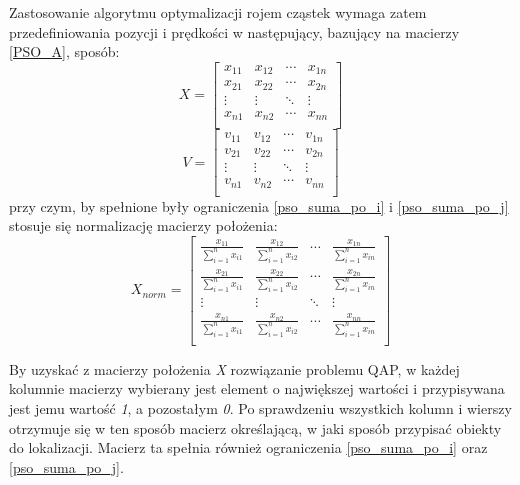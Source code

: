 Zastosowanie algorytmu optymalizacji rojem cząstek wymaga zatem przedefiniowania pozycji i prędkości w następujący, bazujący na macierzy \ref{PSO_A}, sposób:
\newline
\begin{equation}
X=
\begin{bmatrix}
x_{11} & x_{12} & \cdots & x_{1n} \\
x_{21} & x_{22} & \cdots & x_{2n} \\
\vdots & \vdots & \ddots & \vdots \\
x_{n1} & x_{n2} & \cdots & x_{nn} \\
\end{bmatrix}
\end{equation} 
\newline
\begin{equation}
V=
\begin{bmatrix}
v_{11} & v_{12} & \cdots & v_{1n} \\
v_{21} & v_{22} & \cdots & v_{2n} \\
\vdots & \vdots & \ddots & \vdots \\
v_{n1} & v_{n2} & \cdots & v_{nn} \\
\end{bmatrix}
\end{equation}
\newline
przy czym, by spełnione były ograniczenia \ref{pso_suma_po_i} i \ref{pso_suma_po_j} stosuje się normalizację macierzy położenia:
\newline
\begin{equation}
X_{norm}=
\begin{bmatrix}
\frac{x_{11}}{\sum\limits_{i=1}^n x_{i1}} & \frac{x_{12}}{\sum\limits_{i=1}^n x_{i2}} & \cdots &\frac{x_{1n}}{\sum\limits_{i=1}^n x_{in}} \\
\frac{x_{21}}{\sum\limits_{i=1}^n x_{i1}} & \frac{x_{22}}{\sum\limits_{i=1}^n x_{i2}} & \cdots & \frac{x_{2n}}{\sum\limits_{i=1}^n x_{in}} \\
\vdots & \vdots & \ddots & \vdots \\
\frac{x_{n1}}{\sum\limits_{i=1}^n x_{i1}} & \frac{x_{n2}}{\sum\limits_{i=1}^n x_{i2}} & \cdots & \frac{x_{nn}}{\sum\limits_{i=1}^n x_{in}} \\
\end{bmatrix}
\end{equation}
\newline

By uzyskać z macierzy położenia \textit{X} rozwiązanie problemu QAP, w każdej kolumnie macierzy wybierany jest element o największej wartości i przypisywana jest jemu wartość \textit{1}, a pozostałym \textit{0}. Po sprawdzeniu wszystkich kolumn i wierszy otrzymuje się w ten sposób macierz określającą, w jaki sposób przypisać obiekty do lokalizacji. Macierz ta spełnia również ograniczenia \ref{pso_suma_po_i} oraz \ref{pso_suma_po_j}.

